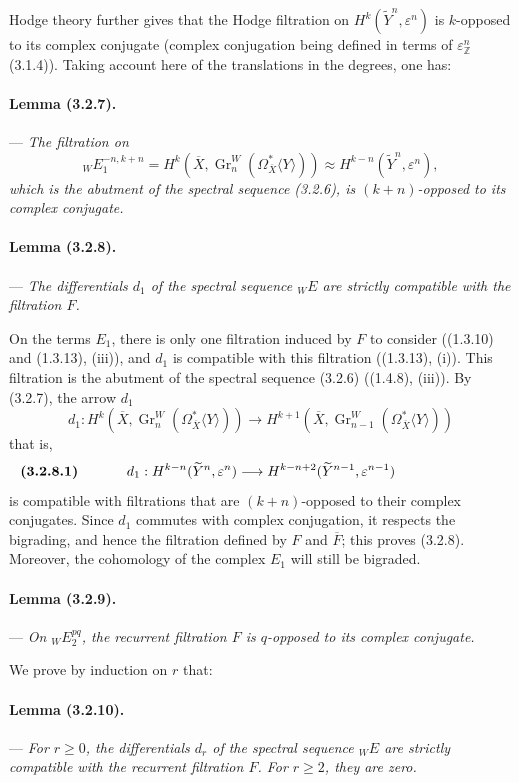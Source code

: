\documentclass[10pt]{article}
\newcommand{\Z}{\mathbb Z}
\newcommand{\Gr}{\operatorname{Gr}}
\begin{document}
Hodge theory further gives that the Hodge filtration on $H^k(\widetilde Y^n,\varepsilon^n)$ is $k$-opposed to its complex conjugate (complex conjugation being defined in terms of $\varepsilon_\Z^n$ (3.1.4)). Taking account here of the translations in the degrees, one has:

\paragraph{Lemma (3.2.7).} --- {\itshape The filtration on
\[
{}_W E_1^{-n,k+n}
=H^k(\overline X,\Gr_n^W(\Omega_{\overline X}^{*}\langle Y\rangle))
\approx H^{k-n}(\widetilde Y^n,\varepsilon^n),
\]
which is the abutment of the spectral sequence (3.2.6), is $(k+n)$-opposed to its complex conjugate.}

\paragraph{Lemma (3.2.8).} --- {\itshape The differentials $d_1$ of the spectral sequence ${}_WE$ are strictly compatible with the filtration $F$.}

On the terms $E_1$, there is only one filtration induced by $F$ to consider ((1.3.10) and (1.3.13), (iii)), and $d_1$ is compatible with this filtration ((1.3.13), (i)). This filtration is the abutment of the spectral sequence (3.2.6) ((1.4.8), (iii)). By (3.2.7), the arrow $d_1$
\[
d_1:H^k(\overline X,\Gr_n^W(\Omega_{\overline X}^{*}\langle Y\rangle))
\longrightarrow
H^{k+1}(\overline X,\Gr_{n-1}^W(\Omega_{\overline X}^{*}\langle Y\rangle))
\]
that is,
\[
\makebox[\textwidth][s]{\textbf{(3.2.8.1)}\hfill$\displaystyle d_1:H^{k-n}(\widetilde Y^n,\varepsilon^n)\longrightarrow H^{k-n+2}(\widetilde Y^{n-1},\varepsilon^{n-1})$\hfill\phantom{\textbf{(3.2.8.1)}}}
\]
is compatible with filtrations that are $(k+n)$-opposed to their complex conjugates. Since $d_1$ commutes with complex conjugation, it respects the bigrading, and hence the filtration defined by $F$ and $\overline F$; this proves (3.2.8). Moreover, the cohomology of the complex $E_1$ will still be bigraded.

\paragraph{Lemma (3.2.9).} --- {\itshape On ${}_WE_2^{pq}$, the recurrent filtration $F$ is $q$-opposed to its complex conjugate.}

We prove by induction on $r$ that:

\paragraph{Lemma (3.2.10).} --- {\itshape For $r\ge0$, the differentials $d_r$ of the spectral sequence ${}_WE$ are strictly compatible with the recurrent filtration $F$. For $r\ge2$, they are zero.}
\end{document}
